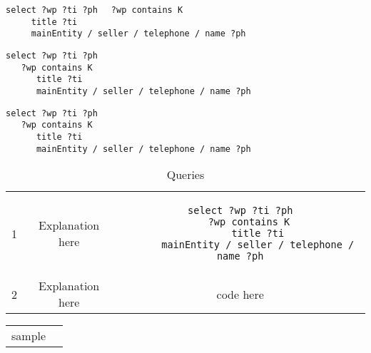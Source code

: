 \verb|select ?wp ?ti ?ph|
\verb|  ?wp contains K|\\
\verb|     title ?ti|\\
\verb|     mainEntity / seller / telephone / name ?ph|

\begin{lstlisting}
select ?wp ?ti ?ph
   ?wp contains K
      title ?ti
      mainEntity / seller / telephone / name ?ph
\end{lstlisting}

\begin{verbatim}
select ?wp ?ti ?ph
   ?wp contains K
      title ?ti
      mainEntity / seller / telephone / name ?ph
\end{verbatim}

\begin{table} 
    \begin{tabular}{ c c c }
        1 & Explanation here & 
\begin{minipage}{3in}\verbatimfont{\small}\begin{verbatim}
select ?wp ?ti ?ph
   ?wp contains K
      title ?ti
      mainEntity / seller / telephone / name ?ph
\end{verbatim}\end{minipage}\\ 
        2 & Explanation here & code here \\ 
    \end{tabular} 
    \caption{Queries} 
\end{table}

\begin{tabular}{ ll }
sample &

\end{tabular}